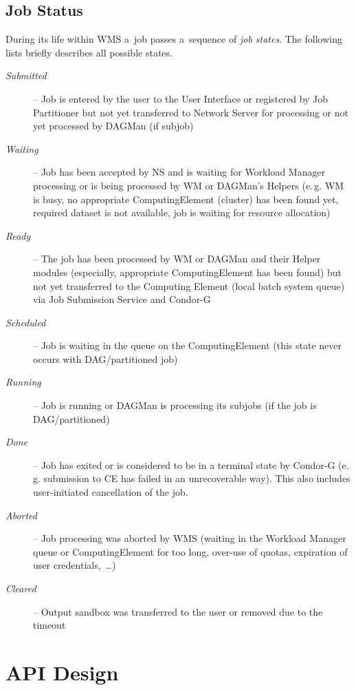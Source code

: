 \documentclass{egee}
\def\eg{e.\,g.\xspace}
\begin{document}
\subsection{Job Status}
\label{s:status}
During its life within WMS a~job passes a~sequence of \emph{job states}.
The following lists briefly describes all possible states.
\begin{description}
\item[\em Submitted] -- Job is entered by the user to the User Interface or registered by Job Partitioner but not yet transferred to Network Server for processing or not yet processed by DAGMan (if subjob)
\item[\em Waiting] -- Job has been accepted by NS and is waiting for Workload Manager processing or is being processed by WM or DAGMan's Helpers
(\eg WM is busy, no appropriate Computing\-Element (cluster) has been found yet, required dataset is not
available, job is waiting for resource allocation)
\item[\em Ready] -- The job has been processed by WM or DAGMan and their Helper modules (especially, appropriate ComputingElement has been found) but not yet transferred to the Computing Element (local batch system queue) via Job Submission Service and Condor-G
\item[\em Scheduled] -- Job is waiting in the queue on the ComputingElement (this state never occurs with DAG/partitioned job)
\item[\em Running] -- Job is running or DAGMan is processing its subjobs (if the job is DAG/partitioned) 
\item[\em Done] -- Job has exited or is considered to be in a terminal state by Condor-G (\eg submission to CE has failed in an unrecoverable way).
This also includes user-initiated cancellation of the job.
\item[\em Aborted] -- Job processing was aborted by WMS (waiting in the Workload Manager queue or ComputingElement for too long, over-use of quotas, expiration of
user credentials,~\ldots)
\item[\em Cleared] -- Output sandbox was transferred to the user or removed due to the timeout

\end{description}

\section{API Design}
\end{document}
